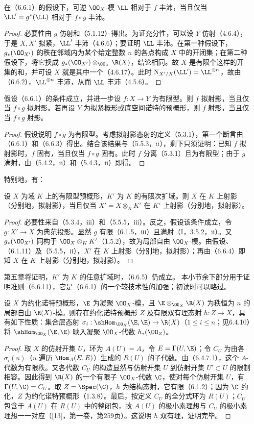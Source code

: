 在（6.6.1）的假设下，可逆 $\OO_X$-模 $\LL$ 相对于 $f$ 丰沛，当且仅当 $\LL'=g^*(\LL)$ 相对于 $f\circ g$ 丰沛。
\begin{proof}
必要性由 $g$ 仿射和（5.1.12）得出。为证充分性，可以设 $Y$ 仿射（4.6.4），于是 $X,X'$ 拟紧，$\LL'$ 丰沛（4.6.6）；要证明 $\LL$ 丰沛。在第一种假设下，$g_*(\OO_{X'})$ 的秩在邻域内为某个给定整数 $n$ 的各点构成 $X$ 中的开闭集；在第二种假设下，将它换成 $g_*(\OO_{X'})\otimes_{\OO_X}\R(X)$，结论相同。故 $X$ 是有限个这样的开集的和，并可设 $X$ 就是其中一个（4.6.17）。此时 $\mathrm N_{X'/X}(\LL')=\LL^{\otimes n}$，故由（6.6.2），$\LL^{\otimes n}$ 丰沛，从而 $\LL$ 丰沛（4.5.6）。
\end{proof}

假设（6.6.1）的条件成立，并进一步设 $f:X\to Y$ 为有限型。则 $f$ 拟射影，当且仅当 $f\circ g$ 拟射影。若再设 $Y$ 为拟紧概形或底空间诺特的预概形，则 $f$ 射影，当且仅当 $f\circ g$ 射影。
\begin{proof}
假设说明 $f\circ g$ 为有限型。考虑拟射影态射的定义（5.3.1），第一个断言由（6.6.1）和（6.6.3）得出。结合该结果与（5.5.3，ii），剩下只须证明：已知 $f$ 拟射影时，$f$ 固有，当且仅当 $f\circ g$ 固有。此时 $f$ 分离（5.3.1）且为有限型；由于 $g$ 满射，由（5.4.2，ii）和（5.4.3，ii）即得。
\end{proof}
特别地，有：

设 $X$ 为域 $K$ 上的有限型预概形，$K'$ 为 $K$ 的有限次扩域。则 $X$ 在 $K$ 上射影（分别地，拟射影），当且仅当 $X'=X\otimes_K K'$ 在 $K'$ 上射影（分别地，拟射影）。
\begin{proof}
必要性来自（5.3.4，iii）和（5.5.5，iii）。反之，假设该条件成立，令 $g:X'\to X$ 为典范投影。显然 $g$ 有限（6.1.5，iii）且满射（I，3.5.2，ii）。又 $g_*(\OO_{X'})$ 同构于 $\OO_X\otimes_K K'$（1.5.2），故为局部自由 $\OO_X$-模。由假设、（6.1.11）及（5.5.5，ii），$X'$ 在 $K$ 上射影（分别地，拟射影）；再由（6.6.4）即知 $X$ 在 $K$ 上射影（分别地，拟射影）。
\end{proof}
第五章将证明，$K'$ 为 $K$ 的任意扩域时，（6.6.5）仍成立。
本小节余下部分用于证明准则（6.6.11），它是（6.6.1）的一个较技术性的加强；初读时可以略过。

设 $X$ 为约化诺特预概形，$\E$ 为凝聚 $\OO_X$-模，且 $\E\otimes_{\OO_X}\R(X)$ 为秩恒为 $n$ 的局部自由 $\R(X)$-模。则存在约化诺特预概形 $Z$ 及有限双有理态射 $h:Z\to X$，具有如下性质：集合层态射
$\sigma_i:\shHom_{\OO_X}(\E,\E)\to\R(X)$（$1\leq i\leq n$；见6.4.10）将 $\shHom_{\OO_X}(\E,\E)$ 映入凝聚 $\OO_X$-代数 $h_*(\OO_Z)$。
\begin{proof}
取 $X$ 的仿射开集 $U$，环为 $A(U)=A$，令 $E=\Gamma(U,\E)$；令 $C_U$ 为由各 $\sigma_i(u)$（$u$ 遍历 $\Hom_A(E,E)$）生成的 $R(U)$ 的子代数。由（6.4.7.1），这个 $A$-代数为有限秩。又各代数 $C_U$ 的构造显然与仿射开集 $U$ 到仿射开集 $U'\subset U$ 的限制相容。因此得到 $\R(X)$ 的一个有限子 $\OO_X$-代数 $\C$，使对每个仿射开集 $U$，有 $\Gamma(U,\C)=C_U$。取 $Z=\Spec(\C)$，$h$ 为结构态射，它有限（6.1.2）；因为 $\C$ 约化，$Z$ 为约化诺特预概形（1.3.8）。最后，按定义 $C_U$ 的全分式环为 $R(U)$；$C_U$ 包含于 $A(U)$ 在 $R(U)$ 中的整闭包，故 $A(U)$ 的极小素理想与 $C_U$ 的极小素理想一一对应（[13]，第一卷，第259页）。这说明 $h$ 双有理，证明完毕。
\end{proof}


